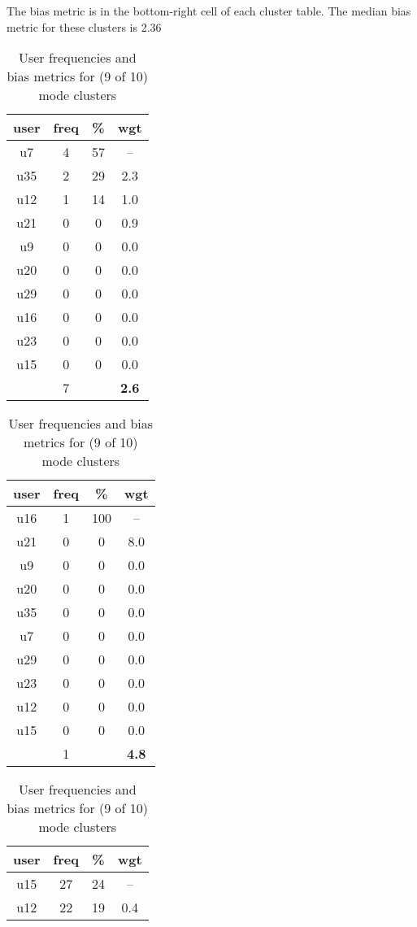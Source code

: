 \begin{appendices}
\begin{table}
\centering
\caption{User frequencies and bias metrics for (9 of 10) mode clusters}
{\small The bias metric is in the bottom-right cell of each cluster table. The median bias metric for these clusters is 2.36 \\}
\bigskip
\begin{tabular}{ |c|c|c|c| }
	\hline
	\textbf{user} & \textbf{freq} & \textbf{\%} & \textbf{wgt} \\
	\hline
	u7 & 4 & 57 & -- \\
	u35 & 2 & 29 & 2.3 \\
	u12 & 1 & 14 & 1.0 \\
	u21 & 0 & 0 & 0.9 \\
	u9 & 0 & 0 & 0.0 \\
	u20 & 0 & 0 & 0.0 \\
	u29 & 0 & 0 & 0.0 \\
	u16 & 0 & 0 & 0.0 \\
	u23 & 0 & 0 & 0.0 \\
	u15 & 0 & 0 & 0.0 \\
	 & 7 & & \textbf{2.6} \\
	\hline
\end{tabular}
\begin{tabular}{ |c|c|c|c| }
	\hline
	\textbf{user} & \textbf{freq} & \textbf{\%} & \textbf{wgt} \\
	\hline
	u16 & 1 & 100 & -- \\
	u21 & 0 & 0 & 8.0 \\
	u9 & 0 & 0 & 0.0 \\
	u20 & 0 & 0 & 0.0 \\
	u35 & 0 & 0 & 0.0 \\
	u7 & 0 & 0 & 0.0 \\
	u29 & 0 & 0 & 0.0 \\
	u23 & 0 & 0 & 0.0 \\
	u12 & 0 & 0 & 0.0 \\
	u15 & 0 & 0 & 0.0 \\
	 & 1 & & \textbf{4.8} \\
	\hline
\end{tabular}
\begin{tabular}{ |c|c|c|c| }
	\hline
	\textbf{user} & \textbf{freq} & \textbf{\%} & \textbf{wgt} \\
	\hline
	u15 & 27 & 24 & -- \\
	u12 & 22 & 19 & 0.4 \\

\end{tabular}
\end{table}
\end{appendices}
